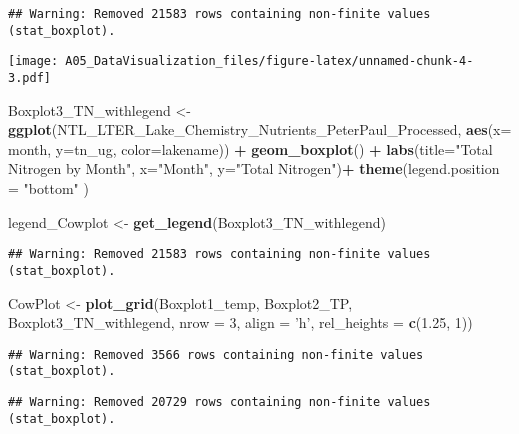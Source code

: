 \documentclass[
]{article}
\newenvironment{Shaded}{\begin{snugshade}}{\end{snugshade}}
\newcommand{\DataTypeTok}[1]{\textcolor[rgb]{0.13,0.29,0.53}{#1}}
\newcommand{\DecValTok}[1]{\textcolor[rgb]{0.00,0.00,0.81}{#1}}
\newcommand{\FloatTok}[1]{\textcolor[rgb]{0.00,0.00,0.81}{#1}}
\newcommand{\KeywordTok}[1]{\textcolor[rgb]{0.13,0.29,0.53}{\textbf{#1}}}
\newcommand{\NormalTok}[1]{#1}
\newcommand{\OperatorTok}[1]{\textcolor[rgb]{0.81,0.36,0.00}{\textbf{#1}}}
\newcommand{\StringTok}[1]{\textcolor[rgb]{0.31,0.60,0.02}{#1}}
\begin{document}
\begin{verbatim}
## Warning: Removed 21583 rows containing non-finite values (stat_boxplot).
\end{verbatim}

\texttt{[image: A05\_DataVisualization\_files/figure-latex/unnamed-chunk-4-3.pdf]}

\begin{Shaded}
\begin{Highlighting}[]
\NormalTok{Boxplot3_TN_withlegend <-}\StringTok{ }\KeywordTok{ggplot}\NormalTok{(NTL_LTER_Lake_Chemistry_Nutrients_PeterPaul_Processed,}
                                 \KeywordTok{aes}\NormalTok{(}\DataTypeTok{x=}\NormalTok{ month, }\DataTypeTok{y=}\NormalTok{tn_ug, }\DataTypeTok{color=}\NormalTok{lakename)) }\OperatorTok{+}
\StringTok{  }\KeywordTok{geom_boxplot}\NormalTok{() }\OperatorTok{+}
\StringTok{  }\KeywordTok{labs}\NormalTok{(}\DataTypeTok{title=}\StringTok{"Total Nitrogen by Month"}\NormalTok{,}
  \DataTypeTok{x=}\StringTok{"Month"}\NormalTok{,}
  \DataTypeTok{y=}\StringTok{"Total Nitrogen"}\NormalTok{)}\OperatorTok{+}
\StringTok{  }\KeywordTok{theme}\NormalTok{(}\DataTypeTok{legend.position =} \StringTok{"bottom"}\NormalTok{ )}

\NormalTok{legend_Cowplot <-}\StringTok{ }\KeywordTok{get_legend}\NormalTok{(Boxplot3_TN_withlegend)}
\end{Highlighting}
\end{Shaded}

\begin{verbatim}
## Warning: Removed 21583 rows containing non-finite values (stat_boxplot).
\end{verbatim}

\begin{Shaded}
\begin{Highlighting}[]
\NormalTok{CowPlot <-}\StringTok{ }\KeywordTok{plot_grid}\NormalTok{(Boxplot1_temp, Boxplot2_TP, Boxplot3_TN_withlegend,}
                     \DataTypeTok{nrow =} \DecValTok{3}\NormalTok{, }\DataTypeTok{align =} \StringTok{'h'}\NormalTok{, }\DataTypeTok{rel_heights =} \KeywordTok{c}\NormalTok{(}\FloatTok{1.25}\NormalTok{, }\DecValTok{1}\NormalTok{))}
\end{Highlighting}
\end{Shaded}

\begin{verbatim}
## Warning: Removed 3566 rows containing non-finite values (stat_boxplot).
\end{verbatim}

\begin{verbatim}
## Warning: Removed 20729 rows containing non-finite values (stat_boxplot).
\end{verbatim}
\end{document}
